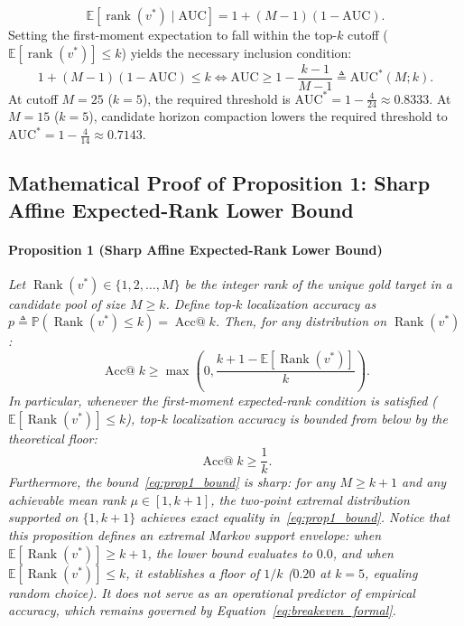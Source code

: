 \documentclass[10pt]{article}
\begin{document}
\begin{equation}
\mathbb{E}[\operatorname{rank}(v^*) \mid \text{AUC}] = 1 + (M - 1)(1 - \text{AUC}).
\end{equation}
Setting the first-moment expectation to fall within the top-$k$ cutoff ($\mathbb{E}[\operatorname{rank}(v^*)] \le k$) yields the necessary inclusion condition:
\begin{equation}
1 + (M - 1)(1 - \text{AUC}) \le k \iff \text{AUC} \ge 1 - \frac{k - 1}{M - 1} \triangleq \text{AUC}^*(M; k).
\label{eq:auc_bound_app}
\end{equation}
At cutoff $M=25$ ($k=5$), the required threshold is $\text{AUC}^* = 1 - \frac{4}{24} \approx 0.8333$. At $M=15$ ($k=5$), candidate horizon compaction lowers the required threshold to $\text{AUC}^* = 1 - \frac{4}{14} \approx 0.7143$.

\subsection{Mathematical Proof of Proposition 1: Sharp Affine Expected-Rank Lower Bound}
\label{app:breakeven_math}
\label{app:prop1_proof}

\paragraph{Proposition 1 (Sharp Affine Expected-Rank Lower Bound)}
\label{prop:affine_bound}
\textit{Let $\operatorname{Rank}(v^*) \in \{1, 2, \dots, M\}$ be the integer rank of the unique gold target in a candidate pool of size $M \ge k$. Define top-$k$ localization accuracy as $p \triangleq \mathbb{P}(\operatorname{Rank}(v^*) \le k) = \operatorname{Acc@}k$. Then, for any distribution on $\operatorname{Rank}(v^*)$:
\begin{equation}
\operatorname{Acc@}k \ge \max\left(0, \frac{k + 1 - \mathbb{E}[\operatorname{Rank}(v^*)]}{k}\right).
\label{eq:prop1_bound}
\end{equation}
In particular, whenever the first-moment expected-rank condition is satisfied ($\mathbb{E}[\operatorname{Rank}(v^*)] \le k$), top-$k$ localization accuracy is bounded from below by the theoretical floor:
\begin{equation}
\operatorname{Acc@}k \ge \frac{1}{k}.
\label{eq:prop1_floor}
\end{equation}
Furthermore, the bound~\eqref{eq:prop1_bound} is sharp: for any $M \ge k + 1$ and any achievable mean rank $\mu \in [1, k+1]$, the two-point extremal distribution supported on $\{1, k+1\}$ achieves exact equality in~\eqref{eq:prop1_bound}. Notice that this proposition defines an extremal Markov support envelope: when $\mathbb{E}[\operatorname{Rank}(v^*)] \ge k+1$, the lower bound evaluates to $0.0$, and when $\mathbb{E}[\operatorname{Rank}(v^*)] \le k$, it establishes a floor of $1/k$ ($0.20$ at $k=5$, equaling random choice). It does not serve as an operational predictor of empirical accuracy, which remains governed by Equation~\eqref{eq:breakeven_formal}.}
\end{document}
